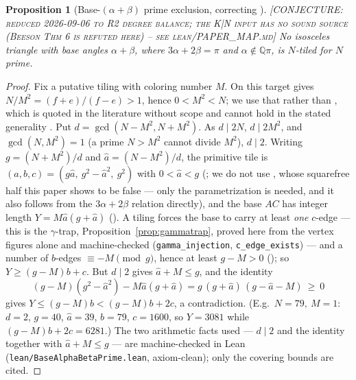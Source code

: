 \documentclass[11pt,reqno]{amsart}
\theoremstyle{plain}
\newtheorem{proposition}[theorem]{Proposition}
\theoremstyle{definition}
\newcommand{\Q}{\mathbb{Q}}
\newcommand{\lab}[1]{\hfill\textnormal{\footnotesize\textsc{[#1]}}}
\begin{document}
\begin{proposition}[Base-$(\alpha{+}\beta)$ prime exclusion, correcting {\cite[Thm.~18]{BeesonIII}}]\label{prop:b3prime}\lab{CONJECTURE: reduced 2026-09-06 to R2 degree balance; the K|N input has no sound source (Beeson Thm 6 is refuted here) -- see lean/PAPER_MAP.md}
No isosceles triangle with base angles $\alpha+\beta$, where $3\alpha+2\beta=\pi$ and
$\alpha\notin\Q\pi$, is $N$-tiled for $N$ prime.
\end{proposition}

\begin{proof}
Fix a putative tiling with coloring number $M$. On this target \cite[Thm.~17]{BeesonIII} gives
$N/M^2=(f+e)/(f-e)>1$, hence $0<M^2<N$; we use that rather than \cite[Cor.~3]{BeesonIII}, which is
quoted in the literature without scope and cannot hold in the stated generality \cite[Rem.~2.1]{Companion}.
Put
$d=\gcd(N-M^2,N+M^2)$. As $d\mid2N$, $d\mid2M^2$, and $\gcd(N,M^2)=1$ (a prime $N>M^2$ cannot divide
$M^2$), $d\mid2$. Writing $g=(N+M^2)/d$ and $\hat a=(N-M^2)/d$, the primitive tile is
$(a,b,c)=(g\hat a,\ g^2-\hat a^2,\ g^2)$ with $0<\hat a<g$ (\cite[Thm.~17]{BeesonIII}; we do not use
\cite[Lem.~8]{BeesonIII}, whose squarefree half this paper shows to be false --- only the
parametrization is needed, and it also follows from the $3\alpha+2\beta$ relation directly), and the
base $AC$ has integer length $Y=M\hat a(g+\hat a)$ (\cite[Lem.~42]{BeesonIII}). A tiling forces the
base to carry at least \emph{one} $c$-edge --- this is the $\gamma$-trap, Proposition~\ref{prop:gammatrap},
proved here from the vertex figures alone and machine-checked
(\texttt{gamma\_injection}, \texttt{c\_edge\_exists}) --- and a number of $b$-edges
$\equiv-M\pmod g$, hence at least $g-M>0$ (\cite[Lem.~45(iii)]{BeesonIII}); so $Y\ge(g-M)b+c$. But
$d\mid2$ gives $\hat a+M\le g$, and the identity
\[
(g-M)(g^2-\hat a^2)-M\hat a(g+\hat a)=g\,(g+\hat a)\,(g-\hat a-M)\ \ge\ 0
\]
gives $Y\le(g-M)b<(g-M)b+2c$, a contradiction. (E.g.\ $N=79,\ M=1$: $d=2$, $g=40$, $\hat a=39$,
$b=79$, $c=1600$, so $Y=3081$ while $(g-M)b+2c=6281$.) The two arithmetic facts used --- $d\mid2$ and
the identity together with $\hat a+M\le g$ --- are machine-checked in Lean
(\texttt{lean/BaseAlphaBetaPrime.lean}, axiom-clean); only the covering bounds are cited.
\end{proof}
\end{document}
